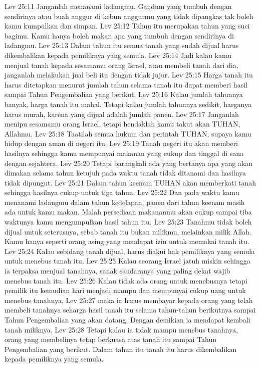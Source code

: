 Lev 25:11  Janganlah menanami ladangmu. Gandum yang tumbuh dengan sendirinya atau buah anggur di kebun anggurmu yang tidak dipangkas tak boleh kamu kumpulkan dan simpan.
Lev 25:12  Tahun itu merupakan tahun yang suci bagimu. Kamu hanya boleh makan apa yang tumbuh dengan sendirinya di ladangmu.
Lev 25:13  Dalam tahun itu semua tanah yang sudah dijual harus dikembalikan kepada pemiliknya yang semula.
Lev 25:14  Jadi kalau kamu menjual tanah kepada sesamamu orang Israel, atau membeli tanah dari dia, janganlah melakukan jual beli itu dengan tidak jujur.
Lev 25:15  Harga tanah itu harus ditetapkan menurut jumlah tahun selama tanah itu dapat memberi hasil sampai Tahun Pengembalian yang berikut.
Lev 25:16  Kalau jumlah tahunnya banyak, harga tanah itu mahal. Tetapi kalau jumlah tahunnya sedikit, harganya harus murah, karena yang dijual adalah jumlah panen.
Lev 25:17  Janganlah menipu sesamamu orang Israel, tetapi hendaklah kamu takut akan TUHAN, Allahmu.
Lev 25:18  Taatilah semua hukum dan perintah TUHAN, supaya kamu hidup dengan aman di negeri itu.
Lev 25:19  Tanah negeri itu akan memberi hasilnya sehingga kamu mempunyai makanan yang cukup dan tinggal di sana dengan sejahtera.
Lev 25:20  Tetapi barangkali ada yang bertanya apa yang akan dimakan selama tahun ketujuh pada waktu tanah tidak ditanami dan hasilnya tidak dipungut.
Lev 25:21  Dalam tahun keenam TUHAN akan memberkati tanah sehingga hasilnya cukup untuk tiga tahun.
Lev 25:22  Dan pada waktu kamu menanami ladangmu dalam tahun kedelapan, panen dari tahun keenam masih ada untuk kamu makan. Malah persediaan makananmu akan cukup sampai tiba waktunya kamu mengumpulkan hasil tahun itu.
Lev 25:23  Tanahmu tidak boleh dijual untuk seterusnya, sebab tanah itu bukan milikmu, melainkan milik Allah. Kamu hanya seperti orang asing yang mendapat izin untuk memakai tanah itu.
Lev 25:24  Kalau sebidang tanah dijual, harus diakui hak pemiliknya yang semula untuk menebus tanah itu.
Lev 25:25  Kalau seorang Israel jatuh miskin sehingga ia terpaksa menjual tanahnya, sanak saudaranya yang paling dekat wajib menebus tanah itu.
Lev 25:26  Kalau tidak ada orang untuk menebusnya tetapi pemilik itu kemudian hari menjadi mampu dan mempunyai cukup uang untuk menebus tanahnya,
Lev 25:27  maka ia harus membayar kepada orang yang telah membeli tanahnya seharga hasil tanah itu selama tahun-tahun berikutnya sampai Tahun Pengembalian yang akan datang. Dengan demikian ia mendapat kembali tanah miliknya.
Lev 25:28  Tetapi kalau ia tidak mampu menebus tanahnya, orang yang membelinya tetap berkuasa atas tanah itu sampai Tahun Pengembalian yang berikut. Dalam tahun itu tanah itu harus dikembalikan kepada pemiliknya yang semula.
